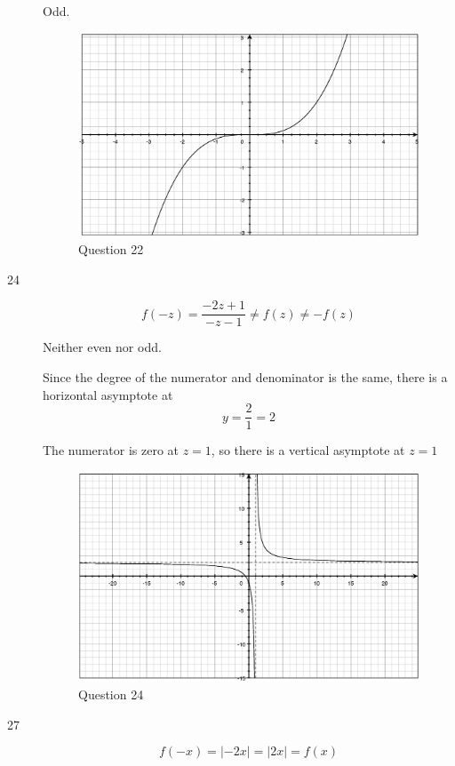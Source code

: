 \documentclass{exam}
\begin{document}
\begin{description}
Odd.

\begin{figure}[H]
  \centering
  \includegraphics[scale=.3]{question_22.eps}
  \caption*{Question 22}
\end{figure}

\item[24]
\[
  f(-z) = \frac{-2z+1}{-z-1} \neq f(z) \neq -f(z)
\]

Neither even nor odd.

Since the degree of the numerator and denominator is the same, there is a horizontal asymptote at 
\[
  y = \frac{2}{1} = 2
\]

The numerator is zero at $z = 1$, so there is a vertical asymptote at $z = 1$

\begin{figure}[H]
  \centering
  \includegraphics[scale=.3]{question_24.eps}
  \caption*{Question 24}
\end{figure}


\item[27]
\[
  f(-x) = |-2x| = |2x| = f(x) 
\]


\end{description}
\end{document}
